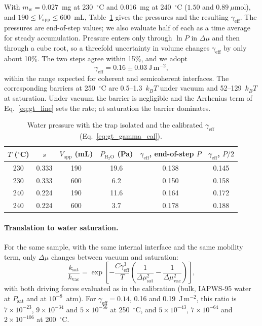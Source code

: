 With $m_{\mathrm{w}} = 0.027$~mg at 230~$^\circ$C and 0.016~mg at 240~$^\circ$C ($1.50$ and
$0.89~\mu$mol), and $190\le V_{\mathrm{app}}\le600$~mL, Table~\ref{tab:gt_gamma} gives the pressures
and the resulting $\gamma_{\mathrm{eff}}$. The pressures are end-of-step values; we also evaluate half
of each as a time average for steady accumulation. Pressure enters only through $\ln P$ in
$\Delta\mu$ and then through a cube root, so a threefold uncertainty in volume changes
$\gamma_{\mathrm{eff}}$ by only about 10\%. The two steps agree within 15\%, and we adopt
\begin{equation}
  \gamma_{\mathrm{eff}} = 0.16\pm0.03~\mathrm{J\,m^{-2}} ,
\end{equation}
within the range expected for coherent and semicoherent interfaces. The corresponding barriers at
250~$^\circ$C are 0.5--1.3~$k_BT$ under vacuum and 52--129~$k_BT$ at saturation. Under vacuum the
barrier is negligible and the Arrhenius term of Eq.~\ref{eq:gt_line} sets the rate; at saturation
the barrier dominates.

\begin{table}
  \centering
  \caption{Water pressure with the trap isolated and the calibrated $\gamma_{\mathrm{eff}}$ (Eq.~\ref{eq:gt_gamma_cal}).}
  \label{tab:gt_gamma}
  \begin{tabular}{cccccc}
    \hline
    $T$ ($^\circ$C) & $s$ & $V_{\mathrm{app}}$ (mL) & $P_{\mathrm{H_2O}}$ (Pa) & $\gamma_{\mathrm{eff}}$, end-of-step $P$ & $\gamma_{\mathrm{eff}}$, $P/2$ \\
    \hline
    230 & 0.333 & 190 & 19.6 & 0.138 & 0.145 \\
    230 & 0.333 & 600 & 6.2  & 0.150 & 0.158 \\
    240 & 0.224 & 190 & 11.6 & 0.164 & 0.172 \\
    240 & 0.224 & 600 & 3.7  & 0.178 & 0.188 \\
    \hline
  \end{tabular}
\end{table}

\paragraph{Translation to water saturation.} For the same sample, with the same internal interface
and the same mobility term, only $\Delta\mu$ changes between vacuum and saturation:
\begin{equation}
  \frac{k_{\mathrm{sat}}}{k_{\mathrm{vac}}} = \exp\!\left[-\frac{C\gamma_{\mathrm{eff}}^{3}}{T}\left(\frac{1}{\Delta\mu_{\mathrm{sat}}^{2}} - \frac{1}{\Delta\mu_{\mathrm{vac}}^{2}}\right)\right],
  \label{eq:gt_translate}
\end{equation}
with both driving forces evaluated as in the calibration (bulk, IAPWS-95 water at $P_{\mathrm{sat}}$ and
at $10^{-8}$~atm). For $\gamma_{\mathrm{eff}} = 0.14$, 0.16 and 0.19~J\,m$^{-2}$, this ratio is
$7\times10^{-23}$, $9\times10^{-34}$ and $5\times10^{-56}$ at 250~$^\circ$C, and $5\times10^{-43}$,
$7\times10^{-64}$ and $2\times10^{-106}$ at 200~$^\circ$C.

